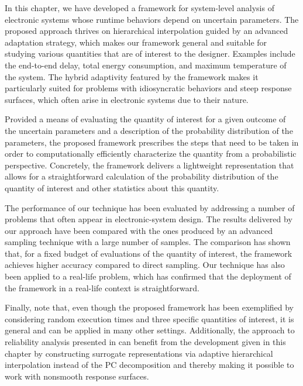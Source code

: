 In this chapter, we have developed a framework for system-level analysis of
electronic systems whose runtime behaviors depend on uncertain parameters. The
proposed approach thrives on hierarchical interpolation guided by an advanced
adaptation strategy, which makes our framework general and suitable for studying
various quantities that are of interest to the designer. Examples include the
end-to-end delay, total energy consumption, and maximum temperature of the
system. The hybrid adaptivity featured by the framework makes it particularly
suited for problems with idiosyncratic behaviors and steep response surfaces,
which often arise in electronic systems due to their nature.

Provided a means of evaluating the quantity of interest for a given outcome of
the uncertain parameters and a description of the probability distribution of
the parameters, the proposed framework prescribes the steps that need to be
taken in order to computationally efficiently characterize the quantity from a
probabilistic perspective. Concretely, the framework delivers a lightweight
representation that allows for a straightforward calculation of the probability
distribution of the quantity of interest and other statistics about this
quantity.

The performance of our technique has been evaluated by addressing a number of
problems that often appear in electronic-system design. The results delivered by
our approach have been compared with the ones produced by an advanced sampling
technique with a large number of samples. The comparison has shown that, for a
fixed budget of evaluations of the quantity of interest, the framework achieves
higher accuracy compared to direct sampling. Our technique has also been applied
to a real-life problem, which has confirmed that the deployment of the framework
in a real-life context is straightforward.

Finally, note that, even though the proposed framework has been exemplified by
considering random execution times and three specific quantities of interest, it
is general and can be applied in many other settings. Additionally, the approach
to reliability analysis presented in  can
benefit from the development given in this chapter by constructing surrogate
representations via adaptive hierarchical interpolation instead of the \ac{PC}
decomposition and thereby making it possible to work with nonsmooth response
surfaces.

